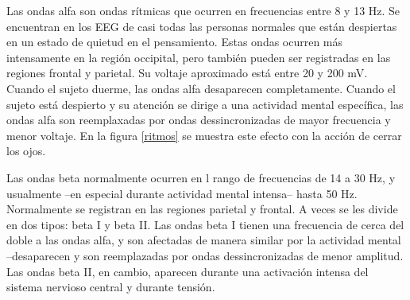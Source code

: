 
Las ondas alfa son ondas r\'itmicas que ocurren en frecuencias entre 8 y 13 Hz. Se encuentran en
los EEG de casi todas las personas normales que est\'an despiertas en un estado de quietud
en el pensamiento.
Estas ondas ocurren m\'as intensamente en la regi\'on occipital, pero tambi\'en pueden ser
registradas en las regiones frontal y parietal. Su voltaje aproximado est\'a entre 20 y 200 mV.
Cuando el sujeto duerme, las ondas alfa desaparecen completamente. Cuando el sujeto est\'a
despierto y su atenci\'on se dirige a una actividad mental espec\'ifica, las ondas alfa
son reemplaxadas por ondas dessincronizadas de mayor frecuencia y menor voltaje.
En la figura \ref{ritmos} se muestra este efecto con la acci\'on de cerrar los ojos.


Las ondas beta normalmente ocurren en l rango de frecuencias de 14 a 30 Hz, y usualmente
--en especial durante actividad mental intensa-- hasta 50 Hz.
Normalmente se registran en las regiones parietal y frontal. A veces se les divide
 en dos tipos: beta I y beta II. Las ondas beta I tienen una frecuencia de cerca del doble a
 las ondas alfa, y son afectadas de manera similar por la actividad mental --desaparecen
y son reemplazadas por ondas dessincronizadas de menor amplitud.
Las ondas beta II, en cambio, aparecen durante una activaci\'on intensa del sistema nervioso
central y durante tensi\'on.

